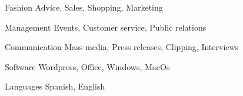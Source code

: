 

\begin{cvskills}

  \cvskill
    {Fashion} %
    {Advice, Sales, Shopping, Marketing} %

  \cvskill
    {Management} %
    {Events, Customer service, Public relations} %

  \cvskill
    {Communication} %
    {Mass media, Press releases, Clipping, Interviews} %

  \cvskill
    {Software} %
    {Wordpress, Office, Windows, MacOs} %

  \cvskill
    {Languages} %
    {Spanish, English} %

\end{cvskills}
